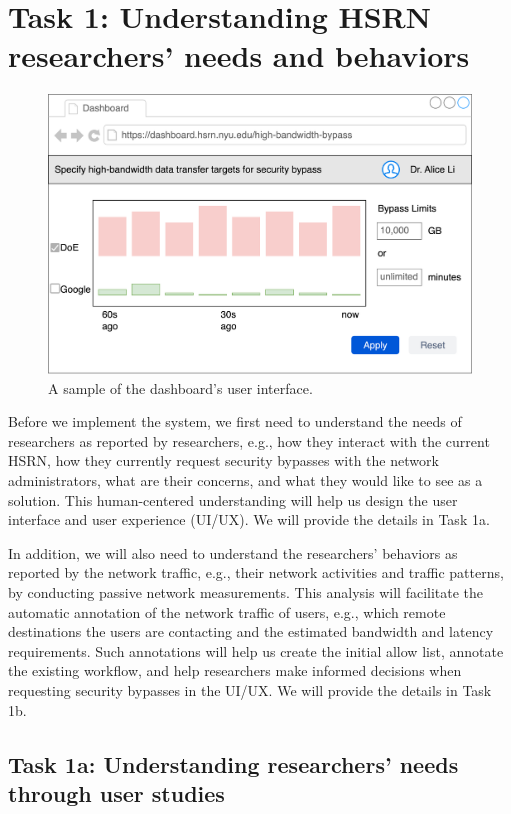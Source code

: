 \section{Task 1: Understanding HSRN researchers' needs and behaviors}

\begin{figure}[t]
    \centering
    \includegraphics[width=0.7\linewidth]{figures/dashboard.png}
    \caption{A sample of the dashboard's user interface.}
    \label{fig:dashboard}
\end{figure}

Before we implement the system, we first need to understand the needs of researchers as reported by researchers, e.g., how they interact with the current HSRN, how they currently request security bypasses with the network administrators, what are their concerns, and what they would like to see as a solution. This human-centered understanding will help us design the user interface and user experience (UI/UX). We will provide the details in Task 1a.

In addition, we will also need to understand the researchers' behaviors as reported by the network traffic, e.g., their network activities and traffic patterns, by conducting passive network measurements. This analysis will facilitate the automatic annotation of the network traffic of users, e.g., which remote destinations the users are contacting and the estimated bandwidth and latency requirements. Such annotations will help us create the initial allow list, annotate the existing workflow, and help researchers make informed decisions when requesting security bypasses in the UI/UX. We will provide the details in Task 1b.

\subsection{Task 1a: Understanding researchers' needs through user studies}

